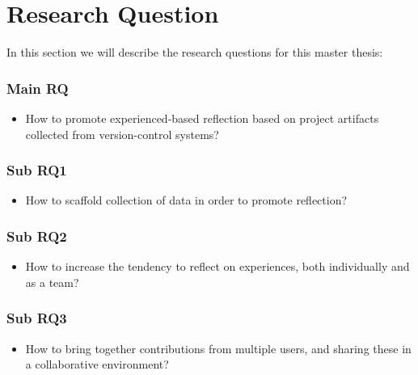 \section{Research Question}
In this section we will describe the research questions for this master thesis:
\subsubsection{Main RQ}
\begin{itemize}
	\item How to promote experienced-based reflection based on project artifacts collected from version-control systems?
\end{itemize}
\subsubsection{Sub RQ1}
\begin{itemize}
	\item How to scaffold collection of data in order to promote reflection?
\end{itemize}

\subsubsection{Sub RQ2}
\begin{itemize}
	\item How to increase the tendency to reflect on experiences, both individually and as a team? 
\end{itemize}

\subsubsection{Sub RQ3}
\begin{itemize}
	\item How to bring together contributions from multiple users, and sharing these in a collaborative environment?
\end{itemize}



